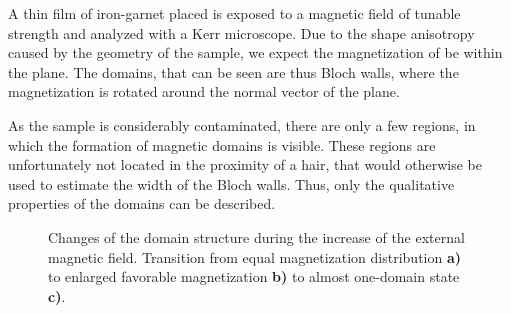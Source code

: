 \documentclass[a4paper]{scrartcl}
\numberwithin{equation}{section}
\numberwithin{figure}{section}
\numberwithin{table}{section}
\begin{document}
A thin film of iron-garnet placed is exposed to a magnetic field of tunable strength and analyzed with a Kerr microscope. Due to the shape anisotropy caused by the geometry of the sample, we expect the magnetization of be within the plane. The domains, that can be seen are thus Bloch walls, where the magnetization is rotated around the normal vector of the plane. 

As the sample is considerably contaminated, there are only a few regions, in which the formation of magnetic domains is visible. These regions are unfortunately not located in the proximity of a hair, that would otherwise be used to estimate the width of the Bloch walls. Thus, only the qualitative properties of the domains can be described.


\begin{figure} 
 \centering
{} \hfill
{} \hfill
{} \hfill
\caption{ Changes of the domain structure during the increase of the external magnetic field. Transition from equal magnetization distribution \textbf{a)} to enlarged favorable magnetization \textbf{b)} to almost one-domain state \textbf{c)}.
\small  } 
	\label{fig:domains}
\end{figure}
\end{document}
